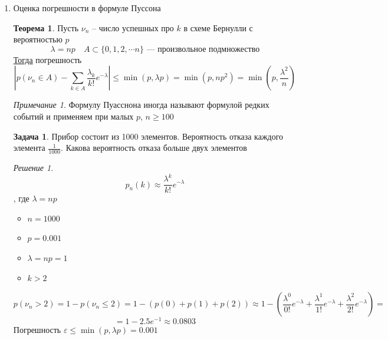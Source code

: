 \documentclass[oneside]{book}
\theoremstyle{plain}
\theoremstyle{remark}
\newtheorem*{remark}{Примечание}
\newtheorem*{solution}{Решение}
\theoremstyle{definition}
\newtheorem{task}{Задача}
\newtheorem{theorem}{Теорема}[section]
\begin{document}
\begin{enumerate}
\item Оценка погрешности в формуле Пуссона
\label{sec:org2115315}
\begin{theorem}
Пусть \(\nu_n\) -- число успешных про \(k\) в схеме Бернулли с вероятностью \(p\)
\[ \lambda = np\quad A \subset \{0, 1, 2, \dotsm n\}\text{ --- произвольное подмножество}\]
\uline{Тогда} погрешность
\[ \left|p(\nu_n \in A) - \sum_{k \in A} \frac{\lambda_k}{k!} e^{-\lambda}\right| \le \min(p, \lambda p) = \min(p, np^2) = \min\left(p, \frac{\lambda^2}{n}\right) \]
\end{theorem}
\begin{remark}
Формулу Пуасснона иногда называют формулой редких событий и применяем при малых \(p\), \(n \ge 100\)
\end{remark}
\begin{task}
Прибор состоит из 1000 элементов. Вероятность отказа каждого элемента \(\frac{1}{1000}\). Какова вероятность отказа больше двух элементов
\end{task}
\begin{solution}
\[ p_n(k) \approx \frac{\lambda^k}{k!}e^{-\lambda} \]
, где \(\lambda = np\)
\begin{itemize}
\item \(n = 1000\)
\item \(p = 0.001\)
\item \(\lambda = np = 1\)
\item \(k > 2\)
\end{itemize}
\[ p(\nu_n > 2) = 1 - p(\nu_n \le 2) = 1 - (p(0) + p(1) + p(2)) \approx 1 - \left(\frac{\lambda^0}{0!} e^{-\lambda} + \frac{\lambda^1}{1!}e^{-\lambda} + \frac{\lambda^2}{2!}e^{-\lambda}\right) = \]
\[ = 1 - 2.5e^{-1} \approx 0.0803\]
Погрешность \(\varepsilon \le \min(p, \lambda p) = 0.001\)
\end{solution}
\end{enumerate}
\end{document}
